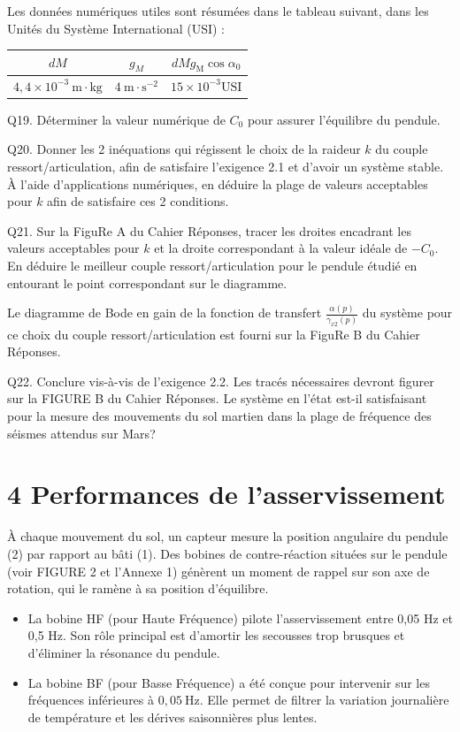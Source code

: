 \documentclass[10pt]{article}
\begin{document}
Les données numériques utiles sont résumées dans le tableau suivant, dans les Unités du Système International (USI) :

\begin{center}
\begin{tabular}{|c|c|c|}
\hline
$d M$ & $g_{M}$ & $d M g_{\mathrm{M}} \cos \alpha_{0}$ \\
\hline
$4,4 \times 10^{-3} \mathrm{~m} \cdot \mathrm{kg}$ & $4 \mathrm{~m} \cdot \mathrm{s}^{-2}$ & $15 \times 10^{-3} \mathrm{USI}$ \\
\hline
\end{tabular}
\end{center}

Q19. Déterminer la valeur numérique de $C_{0}$ pour assurer l'équilibre du pendule.

Q20. Donner les 2 inéquations qui régissent le choix de la raideur $k$ du couple ressort/articulation, afin de satisfaire l'exigence 2.1 et d'avoir un système stable. À l'aide d'applications numériques, en déduire la plage de valeurs acceptables pour $k$ afin de satisfaire ces 2 conditions.

Q21. Sur la FiguRe A du Cahier Réponses, tracer les droites encadrant les valeurs acceptables pour $k$ et la droite correspondant à la valeur idéale de $-C_{0}$. En déduire le meilleur couple ressort/articulation pour le pendule étudié en entourant le point correspondant sur le diagramme.

Le diagramme de Bode en gain de la fonction de transfert $\frac{\alpha(p)}{\gamma_{x 2}(p)}$ du système pour ce choix du couple ressort/articulation est fourni sur la FiguRe B du Cahier Réponses.

Q22. Conclure vis-à-vis de l'exigence 2.2. Les tracés nécessaires devront figurer sur la FIGURE B du Cahier Réponses. Le système en l'état est-il satisfaisant pour la mesure des mouvements du sol martien dans la plage de fréquence des séismes attendus sur Mars?

\section*{4 Performances de l'asservissement}
À chaque mouvement du sol, un capteur mesure la position angulaire du pendule (2) par rapport au bâti (1). Des bobines de contre-réaction situées sur le pendule (voir FIGURE 2 et l'Annexe 1) génèrent un moment de rappel sur son axe de rotation, qui le ramène à sa position d'équilibre.

\begin{itemize}
  \item La bobine HF (pour Haute Fréquence) pilote l'asservissement entre 0,05 Hz et 0,5 Hz. Son rôle principal est d'amortir les secousses trop brusques et d'éliminer la résonance du pendule.
  \item La bobine BF (pour Basse Fréquence) a été conçue pour intervenir sur les fréquences inférieures à $0,05 \mathrm{~Hz}$. Elle permet de filtrer la variation journalière de température et les dérives saisonnières plus lentes.
\end{itemize}
\end{document}
